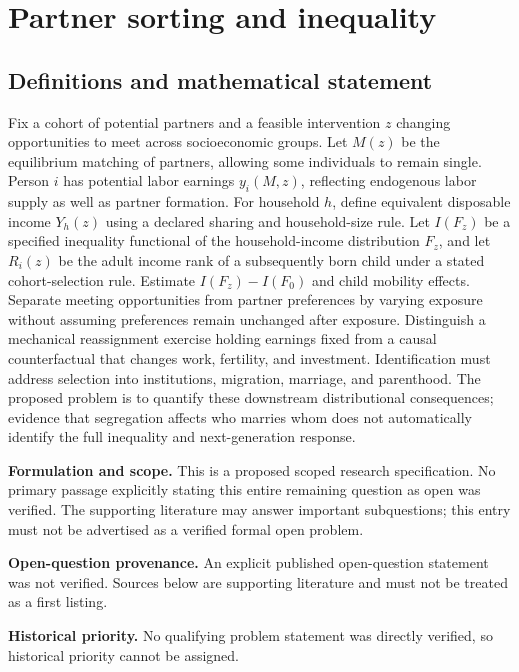 \documentclass[11pt]{article}
\begin{document}
\section*{Partner sorting and inequality}\label{30007649}
\subsection{Definitions and mathematical statement}
Fix a cohort of potential partners and a feasible intervention \(z\) changing opportunities to meet across socioeconomic groups. Let \(M(z)\) be the equilibrium matching of partners, allowing some individuals to remain single. Person \(i\) has potential labor earnings \(y_i(M,z)\), reflecting endogenous labor supply as well as partner formation. For household \(h\), define equivalent disposable income \(Y_h(z)\) using a declared sharing and household-size rule. Let \(I(F_z)\) be a specified inequality functional of the household-income distribution \(F_z\), and let \(R_i(z)\) be the adult income rank of a subsequently born child under a stated cohort-selection rule. Estimate \(I(F_z)-I(F_0)\) and child mobility effects. Separate meeting opportunities from partner preferences by varying exposure without assuming preferences remain unchanged after exposure. Distinguish a mechanical reassignment exercise holding earnings fixed from a causal counterfactual that changes work, fertility, and investment. Identification must address selection into institutions, migration, marriage, and parenthood. The proposed problem is to quantify these downstream distributional consequences; evidence that segregation affects who marries whom does not automatically identify the full inequality and next-generation response.

\par\textbf{Formulation and scope.} This is a proposed scoped research specification. No primary passage explicitly stating this entire remaining question as open was verified. The supporting literature may answer important subquestions; this entry must not be advertised as a verified formal open problem.

\par\textbf{Open-question provenance.} An explicit published open-question statement was not verified. Sources below are supporting literature and must not be treated as a first listing.

\par\textbf{Historical priority.} No qualifying problem statement was directly verified, so historical priority cannot be assigned.
\end{document}
